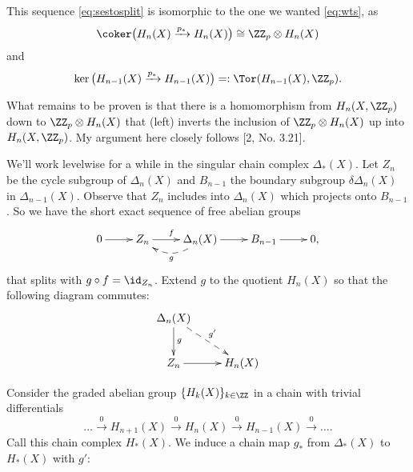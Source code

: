 \documentclass[10pt]{amsart}
\begin{document}
This sequence \eqref{eq:sestosplit} is isomorphic to the one we wanted
\eqref{eq:wts}, as
\[\coker\big(H_n(X) \xrightarrow{p_*} H_n(X)\big) \cong \ZZ_p \otimes H_n(X)\]
and
\[\ker\big( H_{n-1}(X) \xrightarrow{p_*} H_{n-1}(X)\big) =: \Tor(H_{n-1}(X), \ZZ_p).\]

What remains to be proven is that there is a homomorphism from
\(H_n(X, \ZZ_p)\) down to \(\ZZ_p \otimes H_n(X)\) that (left) inverts
the inclusion of \(\ZZ_p \otimes H_n(X)\) up into \(H_n(X, \ZZ_p)\). My
argument here closely follows {[}2, No. 3.21{]}.

We'll work levelwise for a while in the singular chain complex
\(\Delta_*(X)\). Let \(Z_n\) be the cycle subgroup of \(\Delta_n(X)\)
and \(B_{n-1}\) the boundary subgroup \(\delta \Delta_n(X)\) in
\(\Delta_{n-1}(X)\). Observe that \(Z_n\) includes into \(\Delta_n(X)\)
which projects onto \(B_{n-1}\). So we have the short exact sequence of
free abelian groups \begin{equation}
\xymatrix{
0 \ar[r] & Z_n \ar[r]^f & \Delta_n(X) \ar@/^1pc/ @{-->} [l]^g \ar[r] & B_{n-1} \ar[r] & 0,
}
\end{equation} that splits with \(g \circ f = \id_{Z_n}\). Extend \(g\)
to the quotient \(H_n(X)\) so that the following diagram commutes:
\begin{equation}
\label{eq:extend}
\xymatrix{
\Delta_n(X)\ar[d]^g \ar@{-->}[dr]^{g'} & \\
Z_n \ar[r] & H_n(X)
}\end{equation}

Consider the graded abelian group \(\{H_k(X)\}_{k \in \ZZ}\) in a chain
with trivial differentials
\[\ldots \xrightarrow{0} H_{n+1}(X) \xrightarrow{0} H_n(X) \xrightarrow{0} H_{n-1}(X) \xrightarrow{0} \ldots.\]
Call this chain complex \(H_*(X)\). We induce a chain map \(g_*\) from
\(\Delta_*(X)\) to \(H_*(X)\) with \(g'\):
\end{document}
